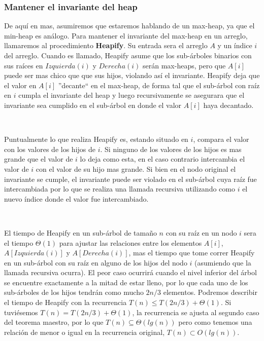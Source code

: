\subsubsection{Mantener el invariante del heap}

De aqu\'i en mas, asumiremos que estaremos hablando de un max-heap, ya que el min-heap es an\'alogo. Para mantener el invariante del max-heap en un arreglo, llamaremos al procedimiento \textbf{Heapify}. Su entrada sera el arreglo $A$ y un \'indice $i$ del arreglo. Cuando es llamado, Heapify asume que los sub-\'arboles binarios con sus ra\'ices en $Izquierda(i)$ y $Derecha(i)$ ser\'an max-heaps, pero que $A[i]$ puede ser mas chico que que sus hijos, violando as\'i el invariante. Heapify deja que el valor en $A[i]$ ''decante`` en el max-heap, de forma tal que el sub-\'arbol con ra\'iz en $i$ cumpla el invariante del heap y luego recursivamente se asegurara que el invariante sea cumplido en el sub-\'arbol en donde el valor $A[i]$ haya decantado.

~

Puntualmente lo que realiza Heapify es, estando situado en $i$, compara el valor con los valores de los hijos de $i$. Si ninguno de los valores de los hijos es mas grande que el valor de $i$ lo deja como esta, en el caso contrario intercambia el valor de $i$ con el valor de su hijo mas grande. Si bien en el nodo original el invariante se cumple, el invariante puede ser violado en el sub-\'arbol cuya ra\'iz fue intercambiada por lo que se realiza una llamada recursiva utilizando como $i$ el nuevo \'indice donde el valor fue intercambiado.

~

El tiempo de Heapify en un sub-\'arbol de tama\~no $n$ con su ra\'iz en un nodo $i$ sera el tiempo $\Theta(1)$ para ajustar las relaciones entre los elementos $A[i]$, $A[Izquierda(i)]$ y $A[Derecha(i)]$, mas el tiempo que tome correr Heapify en un sub-\'arbol con su ra\'iz en alguno de los hijos del nodo $i$ (asumiendo que la llamada recursiva ocurra). El peor caso ocurrir\'a cuando el nivel inferior del \'arbol se encuentre exactamente a la mitad de estar lleno, por lo que cada uno de los sub-\'arboles de los hijos tendr\'an como mucho $2n/3$ elementos. Podremos describir el tiempo de Heapify con la recurrencia $T(n) \leq T(2n/3) + \Theta(1)$. Si tuvi\'esemos $T(n) = T(2n/3) + \Theta(1)$, la recurrencia se ajusta al segundo caso del teorema maestro, por lo que $T(n) \subseteq \Theta(lg(n))$ pero como tenemos una relaci\'on de menor o igual en la recurrencia original, $T(n) \subset O(lg(n))$.

